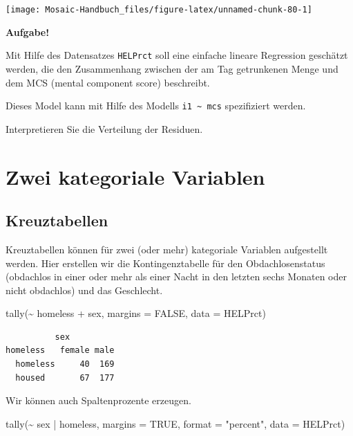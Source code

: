 \documentclass[
  ngerman,
]{scrbook}
\newenvironment{Shaded}{\begin{snugshade}}{\end{snugshade}}
\newcommand{\AttributeTok}[1]{\textcolor[rgb]{0.77,0.63,0.00}{#1}}
\newcommand{\ConstantTok}[1]{\textcolor[rgb]{0.00,0.00,0.00}{#1}}
\newcommand{\FunctionTok}[1]{\textcolor[rgb]{0.00,0.00,0.00}{#1}}
\newcommand{\NormalTok}[1]{#1}
\newcommand{\SpecialCharTok}[1]{\textcolor[rgb]{0.00,0.00,0.00}{#1}}
\newcommand{\StringTok}[1]{\textcolor[rgb]{0.31,0.60,0.02}{#1}}
\newenvironment{aufgabe}[1]
  {
  \begin{itemize}
  \renewcommand{\labelitemi}{
    \raisebox{1.8\height}[0pt][0pt]{
      {\setkeys{Gin}{width=7em,keepaspectratio}
        {\Large \textcolor{dark-fom-green}\faFileCodeO}}
        }
  }
  \begin{blackbox}
        \bgroup\color{dark-fom-green}
          {\textbf{Aufgabe!}}
        \egroup
   \item
    }
    {
  \end{blackbox}
  \end{itemize}
  }
\begin{document}
\begin{center}\texttt{[image: Mosaic-Handbuch\_files/figure-latex/unnamed-chunk-80-1]} \end{center}

\begin{aufgabe}{aufgabe}
Mit Hilfe des Datensatzes \texttt{HELPrct} soll eine einfache lineare Regression geschätzt werden, die den Zusammenhang zwischen der am Tag getrunkenen Menge und dem MCS (mental component score) beschreibt.

Dieses Model kann mit Hilfe des Modells \texttt{i1\ \textasciitilde{}\ mcs} spezifiziert werden.

Interpretieren Sie die Verteilung der Residuen.

\end{aufgabe}

\hypertarget{zwei-kategoriale-variablen}{%
\chapter{Zwei kategoriale Variablen}\label{zwei-kategoriale-variablen}}

\hypertarget{kreuztab}{%
\section{Kreuztabellen}\label{kreuztab}}

Kreuztabellen können für zwei (oder mehr) kategoriale Variablen aufgestellt werden. Hier erstellen wir die Kontingenztabelle für den Obdachlosenstatus (obdachlos in einer oder mehr als einer Nacht in den letzten sechs Monaten oder nicht obdachlos) und das Geschlecht.

\begin{Shaded}
\begin{Highlighting}[]
\FunctionTok{tally}\NormalTok{(}\SpecialCharTok{\textasciitilde{}}\NormalTok{ homeless }\SpecialCharTok{+}\NormalTok{ sex, }\AttributeTok{margins =} \ConstantTok{FALSE}\NormalTok{, }
      \AttributeTok{data =}\NormalTok{ HELPrct)}
\end{Highlighting}
\end{Shaded}

\begin{verbatim}
          sex
homeless   female male
  homeless     40  169
  housed       67  177
\end{verbatim}

Wir können auch Spaltenprozente erzeugen.

\begin{Shaded}
\begin{Highlighting}[]
\FunctionTok{tally}\NormalTok{(}\SpecialCharTok{\textasciitilde{}}\NormalTok{ sex }\SpecialCharTok{|}\NormalTok{ homeless, }\AttributeTok{margins =} \ConstantTok{TRUE}\NormalTok{, }
      \AttributeTok{format =} \StringTok{"percent"}\NormalTok{, }\AttributeTok{data =}\NormalTok{ HELPrct)}
\end{Highlighting}
\end{Shaded}
\end{document}
